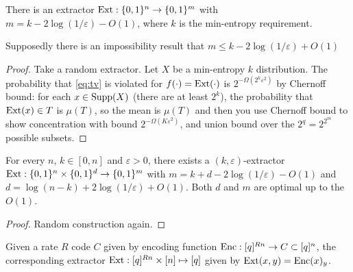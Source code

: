 \begin{proposition}
  There is an extractor $\textnormal{Ext}:\{0,1\}^n\to\{0,1\}^m$ with $m=k-2\log(1/\varepsilon)-O(1)$, where $k$ is the min-entropy requirement.

  Supposedly there is an impossibility result that  $m\le k-2\log(1/\varepsilon)+O(1)$
\end{proposition}
\begin{proof}
  Take a random extractor. Let $X$ be a min-entropy $k$ distribution. 
  The probability that \eqref{eq:tv} is violated for $f(\cdot)=\textnormal{Ext}(\cdot)$ is $2^{-\Omega(2^k\varepsilon^2)}$ by Chernoff bound: for each $x\in\operatorname*{Supp}(X)$ (there are at least $2^k$), the probability that $\textnormal{Ext}(x)\in T$ is $\mu(T)$, so the mean is $\mu(T)$ and then you use Chernoff bound to show concentration with bound $2^{-\Omega(K\varepsilon^2)}$, and union bound over the $2^q=2^{2^m}$ possible subsets.
\end{proof}
\begin{theorem}
  For every $n$, $k\in[0,n]$ and $\varepsilon > 0$, there exists a $(k,\varepsilon)$-extractor $\textnormal{Ext} : \{0,1\}^n \times  \{0,1\}^d \to \{0,1\}^m$ with $m = k + d - 2\log(1/\varepsilon) - O(1)$ and $d = \log(n - k) + 2\log(1/\varepsilon) + O(1)$.
  Both $d$ and $m$ are optimal up to the $O(1)$.
\end{theorem}
\begin{proof}
  Random construction again.
\end{proof}


\begin{definition}
  Given a rate $R$ code $C$ given by encoding function $\operatorname*{Enc}:[q]^{Rn}\to C\subset[q]^n$, the corresponding extractor $\textnormal{Ext}:[q]^{Rn}\times [n]\mapsto [q]$ given by $\textnormal{Ext}(x,y) = \operatorname*{Enc}(x)_y$.
\end{definition}


